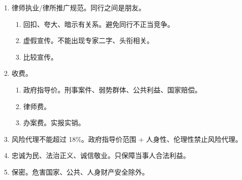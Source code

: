 \begin{enumerate}
  \item 律师执业/律所推广规范。同行之间是朋友。
        \begin{enumerate}
          \item 回扣、夸大、暗示有关系。避免同行不正当竞争。
          \item 虚假宣传。不能出现专家二字、头衔相关。
          \item 比较宣传。
        \end{enumerate}
  \item 收费。
        \begin{enumerate}
          \item 政府指导价。刑事案件、弱势群体、公共利益、国家赔偿。
          \item 律师费。
          \item 办案费。实报实销。
        \end{enumerate}
  \item 风险代理不能超过 18\%。政府指导价范围 + 人身性、伦理性禁止风险代理。
  \item 忠诚为民、法治正义、诚信敬业。只保障当事人合法利益。
  \item 保密。危害国家、公共、人身财产安全除外。
\end{enumerate}
